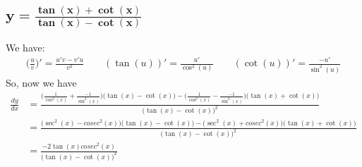 \documentclass{article}
\begin{document}
\subsection{$\mathbf{y=\frac{\tan(x) + \cot(x)}{\tan(x)-\cot(x)}}$}
\noindent We have:
\begin{align*}
    \Big(\frac{u}{v}\Big)'=\frac{u'v-v'u}{v^2} \qquad (\tan(u))'=\frac{u'}{\cos^2(u)} \qquad (\cot(u))'=\frac{-u'}{\sin^2(u)}
\end{align*}
So, now we have
\begin{align*}
    \frac{dy}{dx} &= \frac{\Big(\frac{1}{\cos^2(x)} + \frac{-1}{\sin^2(x)}\Big)\Big(\tan(x)-\cot(x)\Big)-\Big(\frac{1}{\cos^2(x)} - \frac{-1}{\sin^2(x)}\Big)\Big(\tan(x)+\cot(x)\Big)}{\Big(\tan(x)-\cot(x)\Big)^2} \\
            &= \frac{\Big(\sec^2(x)-cosec^2(x)\Big)\Big(\tan(x)-\cot(x)\Big)-\Big(\sec^2(x)+cosec^2(x)\Big)\Big(\tan(x)+\cot(x)\Big)}{\Big(\tan(x)-\cot(x)\Big)^2} \\
            &= \frac{-2\tan(x)cosec^2(x)}{\Big(\tan(x)-\cot(x)\Big)^2}
\end{align*}
\end{document}
